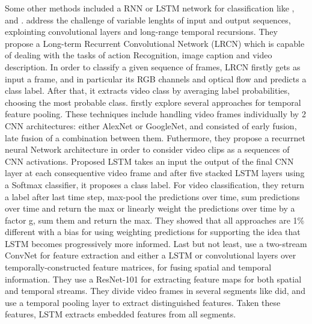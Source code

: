 \documentclass{report}
\begin{document}
Some other methods included a RNN or LSTM network for classification like \cite{DBLP:journals/corr/DonahueHGRVSD14}, \cite{DBLP:journals/corr/NgHVVMT15} and \cite{DBLP:journals/corr/MaCKA17}.  \cite{DBLP:journals/corr/DonahueHGRVSD14} address the challenge of variable lenghts of
input and output sequences, explointing convolutional layers and long-range temporal recursions. They propose a Long-term Recurrent
Convolutional Network (LRCN) which is capable of dealing with the tasks of action Recognition, image caption and video description. In order to classify a given sequence of frames, LRCN firstly gets as input a frame, and in particular its RGB channels and optical flow and predicts a class label. After that, it extracts video class by averaging label probabilities, choosing the most probable class.
\cite{DBLP:journals/corr/NgHVVMT15} firstly explore several approaches for temporal feature pooling. These techniques include handling video
frames individually by 2 CNN architectures: either AlexNet or GoogleNet, and consisted of early fusion, late fusion of a combination between
them. Futhermore, they propose a recurrnet neural Network architecture in order to consider video clips as a sequences of CNN activations.
Proposed LSTM takes an input the output of the final CNN layer at each consequentive video frame and after five stacked LSTM layers using a
Softmax classifier, it proposes a class label. For video classification, they return a label after last time step, max-pool the predictions
over time, sum predictions over time and return the max or linearly weight the predictions over time by a factor g, sum them and return the max.
They showed that all approaches are 1\% different with a bias for using weighting predictions for supporting the idea that LSTM becomes progressively more informed. Last but not least,  \cite{DBLP:journals/corr/MaCKA17} use a two-stream ConvNet for feature extraction and either a LSTM or convolutional layers over temporally-constructed feature matrices, for fusing spatial and temporal information. They use a ResNet-101 for
extracting feature maps for both spatial and temporal streams. They divide video frames in several segments like \cite{DBLP:journals/corr/WangXW0LTG16} did, and use a temporal pooling layer to extract distinguished features. Taken these features, LSTM extracts embedded features from all segments.
\par
\end{document}
